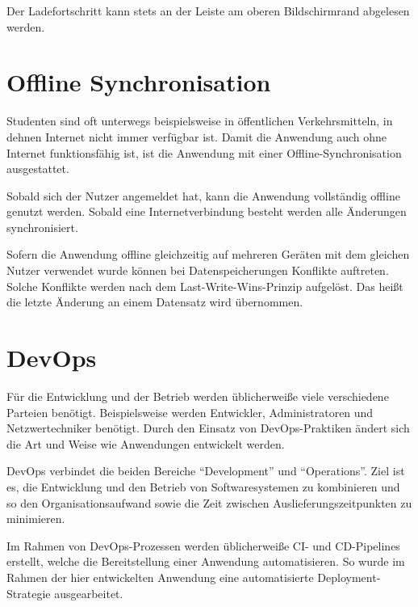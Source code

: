 










Der Ladefortschritt kann stets an der Leiste am oberen Bildschirmrand abgelesen werden.



\section{Offline Synchronisation}
Studenten sind oft unterwegs beispielsweise in öffentlichen Verkehrsmitteln, in dehnen Internet nicht immer verfügbar ist.
Damit die Anwendung auch ohne Internet funktionsfähig ist, ist die Anwendung mit einer Offline-Synchronisation ausgestattet.

Sobald sich der Nutzer angemeldet hat, kann die Anwendung vollständig offline genutzt werden.
Sobald eine Internetverbindung besteht werden alle Änderungen synchronisiert.

Sofern die Anwendung offline gleichzeitig auf mehreren Geräten mit dem gleichen Nutzer verwendet wurde können bei Datenspeicherungen Konflikte auftreten.
Solche Konflikte werden nach dem Last-Write-Wins-Prinzip aufgelöst.
Das heißt die letzte Änderung an einem Datensatz wird übernommen.


\section{DevOps}
Für die Entwicklung und der Betrieb werden üblicherweiße viele verschiedene Parteien benötigt.
Beispielsweise werden Entwickler, Administratoren und Netzwertechniker benötigt.
Durch den Einsatz von DevOps-Praktiken ändert sich die Art und Weise wie Anwendungen entwickelt werden.

DevOps verbindet die beiden Bereiche \enquote{Development} und \enquote{Operations}.
Ziel ist es, die Entwicklung und den Betrieb von Softwaresystemen zu kombinieren und so den Organisationsaufwand sowie die Zeit zwischen Auslieferungszeitpunkten zu minimieren.\autocite[][S. 156]{Artac2018}

Im Rahmen von DevOps-Prozessen werden üblicherweiße \ac{CI}- und \ac{CD}-Pipelines erstellt, welche die Bereitstellung einer Anwendung automatisieren.
So wurde im Rahmen der hier entwickelten Anwendung eine automatisierte Deployment-Strategie ausgearbeitet.

